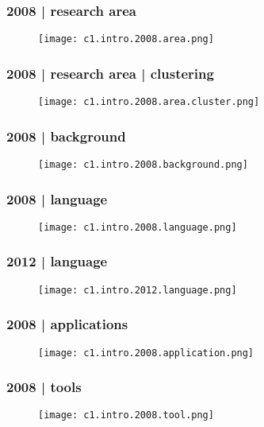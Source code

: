 \begin{frame}
  \frametitle{2008 | research area}
   \begin{figure}
     \centering
     \texttt{[image: c1.intro.2008.area.png]}
   \end{figure} 
\end{frame}

\begin{frame}
  \frametitle{2008 | research area | clustering}
   \begin{figure}
     \centering
     \texttt{[image: c1.intro.2008.area.cluster.png]}
   \end{figure} 
\end{frame}

\begin{frame}
  \frametitle{2008 | background}
   \begin{figure}
     \centering
     \texttt{[image: c1.intro.2008.background.png]}
   \end{figure} 
\end{frame}

\begin{frame}
  \frametitle{2008 | language}
   \begin{figure}
     \centering
     \texttt{[image: c1.intro.2008.language.png]}
   \end{figure} 
\end{frame}

\begin{frame}
  \frametitle{2012 | language}
   \begin{figure}
     \centering
     \texttt{[image: c1.intro.2012.language.png]}
   \end{figure} 
\end{frame}

\begin{frame}
  \frametitle{2008 | applications}
   \begin{figure}
     \centering
     \texttt{[image: c1.intro.2008.application.png]}
   \end{figure} 
\end{frame}

\begin{frame}
  \frametitle{2008 | tools}
   \begin{figure}
     \centering
     \texttt{[image: c1.intro.2008.tool.png]}
   \end{figure} 
\end{frame}

